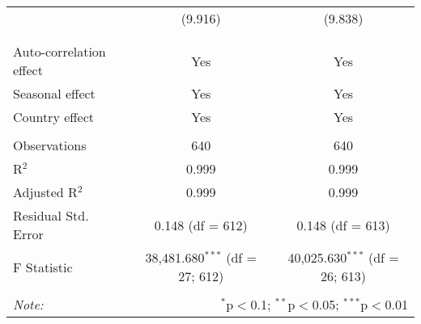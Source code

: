 \begin{table}[!htbp]
\begin{tabular}{@{\extracolsep{5pt}}lcc}
  & (9.916) & (9.838) \\ 
  & & \\ 
\hline \\[-1.8ex] 
Auto-correlation effect & Yes & Yes \\ 
Seasonal effect & Yes & Yes \\ 
Country effect & Yes & Yes \\ 
\hline \\[-1.8ex] 
Observations & 640 & 640 \\ 
R$^{2}$ & 0.999 & 0.999 \\ 
Adjusted R$^{2}$ & 0.999 & 0.999 \\ 
Residual Std. Error & 0.148 (df = 612) & 0.148 (df = 613) \\ 
F Statistic & 38,481.680$^{***}$ (df = 27; 612) & 40,025.630$^{***}$ (df = 26; 613) \\ 
\hline 
\hline \\[-1.8ex] 
\textit{Note:}  & \multicolumn{2}{r}{$^{*}$p$<$0.1; $^{**}$p$<$0.05; $^{***}$p$<$0.01} \\ 
\end{tabular} 
\end{table} 
